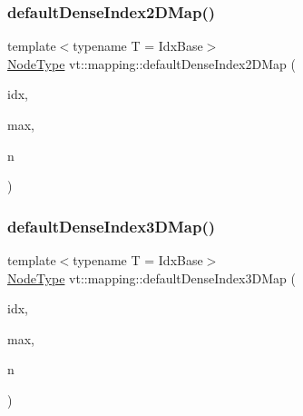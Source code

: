 \subsubsection{\texorpdfstring{default\+Dense\+Index2\+D\+Map()}{defaultDenseIndex2DMap()}}
{\footnotesize\ttfamily template$<$typename T  = Idx\+Base$>$ \\
\hyperlink{namespacevt_a866da9d0efc19c0a1ce79e9e492f47e2}{Node\+Type} vt\+::mapping\+::default\+Dense\+Index2\+D\+Map (\begin{DoxyParamCaption}\item[{\hyperlink{namespacevt_1_1mapping_a6832cbb1361fe72fd7ec730e7b7773b3}{Idx2\+D\+Ptr}$<$ T $>$}]{idx,  }\item[{\hyperlink{namespacevt_1_1mapping_a6832cbb1361fe72fd7ec730e7b7773b3}{Idx2\+D\+Ptr}$<$ T $>$}]{max,  }\item[{\hyperlink{namespacevt_a866da9d0efc19c0a1ce79e9e492f47e2}{Node\+Type}}]{n }\end{DoxyParamCaption})}

\mbox{\label{namespacevt_1_1mapping_a776a69138a1fbceab5bbf10b9c07a858}} 
\subsubsection{\texorpdfstring{default\+Dense\+Index3\+D\+Map()}{defaultDenseIndex3DMap()}}
{\footnotesize\ttfamily template$<$typename T  = Idx\+Base$>$ \\
\hyperlink{namespacevt_a866da9d0efc19c0a1ce79e9e492f47e2}{Node\+Type} vt\+::mapping\+::default\+Dense\+Index3\+D\+Map (\begin{DoxyParamCaption}\item[{\hyperlink{namespacevt_1_1mapping_aacc737158b6517f2d760ffc8d1b5abca}{Idx3\+D\+Ptr}$<$ T $>$}]{idx,  }\item[{\hyperlink{namespacevt_1_1mapping_aacc737158b6517f2d760ffc8d1b5abca}{Idx3\+D\+Ptr}$<$ T $>$}]{max,  }\item[{\hyperlink{namespacevt_a866da9d0efc19c0a1ce79e9e492f47e2}{Node\+Type}}]{n }\end{DoxyParamCaption})}

\mbox{\label{namespacevt_1_1mapping_a39633710d765933d6d91b8bb9818fcc7}} 
